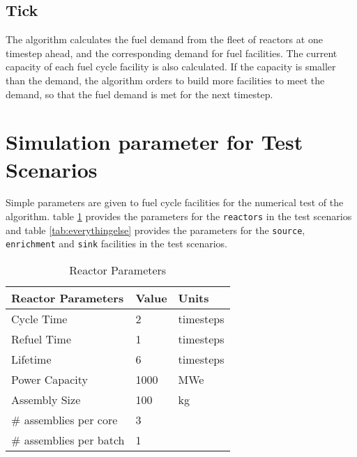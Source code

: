 \documentclass[12pt,letterpaper]{article}
\begin{document}
\subsection{Tick}
The algorithm calculates the fuel demand
from the fleet of reactors at one timestep ahead, and the corresponding demand for fuel facilities.
The current capacity of each fuel cycle facility is also calculated. If the capacity
is smaller than the demand, the algorithm orders to build more facilities to meet the demand,
so that the fuel demand is met for the next timestep.

\section{Simulation parameter for Test Scenarios}
Simple parameters are given to fuel cycle facilities for the numerical test of 
the algorithm.  
table \ref{tab:reactor} provides the parameters for the \texttt{reactors} in the test scenarios and table \ref{tab:everythingelse} provides the parameters for the \texttt{source}, \texttt{enrichment} and \texttt{sink} facilities in the test scenarios.

\begin{table}[h]
    \centering
    \begin{tabularx}{\textwidth}{bbb}
       \hline
       Reactor Parameters & Value & Units \\
       \hline
       Cycle Time & 2 & timesteps \\
       Refuel Time & 1 & timesteps \\
       Lifetime & 6 & timesteps \\
       Power Capacity & 1000 & MWe \\
       Assembly Size & 100 & kg \\
       \# assemblies per core & 3 & \\
       \# assemblies per batch & 1 & \\
       \hline
    \end{tabularx}
    \caption {Reactor Parameters}
    \label{tab:reactor}
\end{table}
\end{document}
